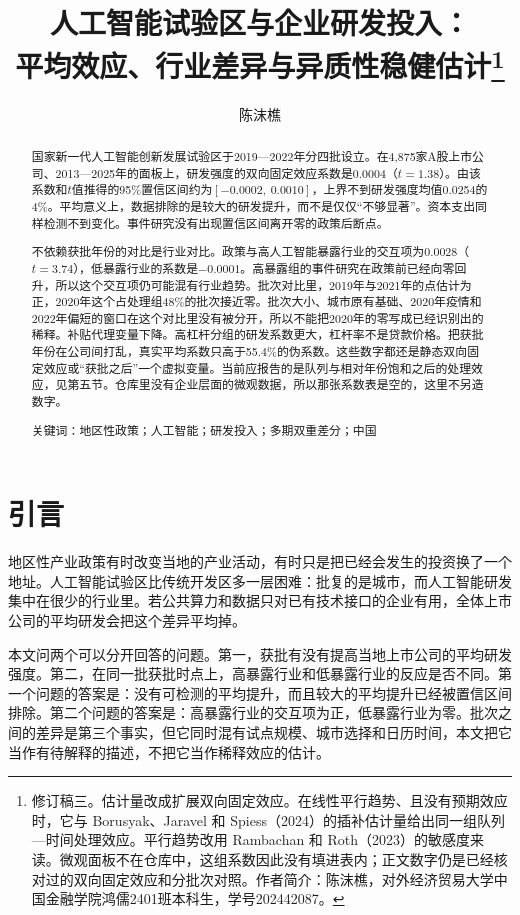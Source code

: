 \documentclass[12pt,hyperref,a4paper,UTF8]{ctexart}
\title{\songti\bfseries\zihao{2} 人工智能试验区与企业研发投入：\\平均效应、行业差异与异质性稳健估计\thanks{修订稿三。估计量改成扩展双向固定效应。在线性平行趋势、且没有预期效应时，它与 Borusyak、Jaravel 和 Spiess（2024）的插补估计量给出同一组队列—时间处理效应。平行趋势改用 Rambachan 和 Roth（2023）的敏感度来读。微观面板不在仓库中，这组系数因此没有填进表内；正文数字仍是已经核对过的双向固定效应和分批次对照。作者简介：陈沫樵，对外经济贸易大学中国金融学院鸿儒2401班本科生，学号202442087。}}
\author{\songti\zihao{4} 陈沫樵}
\date{}
\begin{document}
\maketitle

\begin{abstract}
国家新一代人工智能创新发展试验区于2019—2022年分四批设立。在4,875家A股上市公司、2013—2025年的面板上，研发强度的双向固定效应系数是0.0004（$t=1.38$）。由该系数和$t$值推得的95\%置信区间约为$[-0.0002,\ 0.0010]$，上界不到研发强度均值0.0254的4\%。平均意义上，数据排除的是较大的研发提升，而不是仅仅“不够显著”。资本支出同样检测不到变化。事件研究没有出现置信区间离开零的政策后断点。

不依赖获批年份的对比是行业对比。政策与高人工智能暴露行业的交互项为0.0028（$t=3.74$），低暴露行业的系数是$-0.0001$。高暴露组的事件研究在政策前已经向零回升，所以这个交互项仍可能混有行业趋势。批次对比里，2019年与2021年的点估计为正，2020年这个占处理组48\%的批次接近零。批次大小、城市原有基础、2020年疫情和2022年偏短的窗口在这个对比里没有被分开，所以不能把2020年的零写成已经识别出的稀释。补贴代理变量下降。高杠杆分组的研发系数更大，杠杆率不是贷款价格。把获批年份在公司间打乱，真实平均系数只高于55.4\%的伪系数。这些数字都还是静态双向固定效应或“获批之后”一个虚拟变量。当前应报告的是队列与相对年份饱和之后的处理效应，见第五节。仓库里没有企业层面的微观数据，所以那张系数表是空的，这里不另造数字。

{\heiti 关键词：}地区性政策；人工智能；研发投入；多期双重差分；中国
\end{abstract}

\section{引\quad 言}

地区性产业政策有时改变当地的产业活动，有时只是把已经会发生的投资换了一个地址\parencite{kline2014local,neumark2011enterprise,wang2013sez}。人工智能试验区比传统开发区多一层困难：批复的是城市，而人工智能研发集中在很少的行业里。若公共算力和数据只对已有技术接口的企业有用，全体上市公司的平均研发会把这个差异平均掉\parencite{cohen1990absorptive,bloom2019toolkit}。

本文问两个可以分开回答的问题。第一，获批有没有提高当地上市公司的平均研发强度。第二，在同一批获批时点上，高暴露行业和低暴露行业的反应是否不同。第一个问题的答案是：没有可检测的平均提升，而且较大的平均提升已经被置信区间排除。第二个问题的答案是：高暴露行业的交互项为正，低暴露行业为零。批次之间的差异是第三个事实，但它同时混有试点规模、城市选择和日历时间，本文把它当作有待解释的描述，不把它当作稀释效应的估计。
\end{document}
